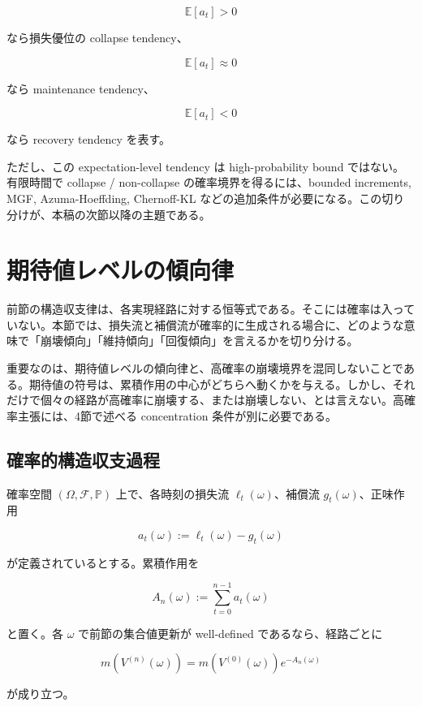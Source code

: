 \documentclass[12pt,a4paper]{article}
\begin{document}
\[
\mathbb E[a_{t}] > 0
\]

なら損失優位の collapse tendency、

\[
\mathbb E[a_{t}] \approx 0
\]

なら maintenance tendency、

\[
\mathbb E[a_{t}] < 0
\]

なら recovery tendency を表す。

ただし、この expectation-level tendency は high-probability bound ではない。有限時間で collapse / non-collapse の確率境界を得るには、bounded increments, MGF, Azuma-Hoeffding, Chernoff-KL などの追加条件が必要になる。この切り分けが、本稿の次節以降の主題である。

\section{期待値レベルの傾向律}\label{ux671fux5f85ux5024ux30ecux30d9ux30ebux306eux50beux5411ux5f8b}

前節の構造収支律は、各実現経路に対する恒等式である。そこには確率は入っていない。本節では、損失流と補償流が確率的に生成される場合に、どのような意味で「崩壊傾向」「維持傾向」「回復傾向」を言えるかを切り分ける。

重要なのは、期待値レベルの傾向律と、高確率の崩壊境界を混同しないことである。期待値の符号は、累積作用の中心がどちらへ動くかを与える。しかし、それだけで個々の経路が高確率に崩壊する、または崩壊しない、とは言えない。高確率主張には、4節で述べる concentration 条件が別に必要である。

\subsection{確率的構造収支過程}\label{ux78baux7387ux7684ux69cbux9020ux53ceux652fux904eux7a0b}

確率空間 \((\Omega,\mathcal F,\mathbb P)\) 上で、各時刻の損失流 \(\ell_{t}(\omega)\)、補償流 \(g_{t}(\omega)\)、正味作用

\[
a_{t}(\omega) := \ell_{t}(\omega)-g_{t}(\omega)
\]

が定義されているとする。累積作用を

\[
A_{n}(\omega) := \sum_{t=0}^{n-1} a_{t}(\omega)
\]

と置く。各 \(\omega\) で前節の集合値更新が well-defined であるなら、経路ごとに

\[
m(V^{(n)}(\omega)) = m(V^{(0)}(\omega)) e^{-A_{n}(\omega)}
\]

が成り立つ。
\end{document}
